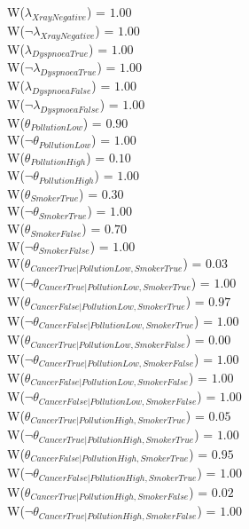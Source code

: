 \documentclass[a4paper,10pt]{report}
\begin{document}
W($\lambda_{XrayNegative}$) = $1.00$\\ 
W($\neg \lambda_{XrayNegative}$) = $1.00$\\ 
W($\lambda_{DyspnoeaTrue}$) = $1.00$\\ 
W($\neg \lambda_{DyspnoeaTrue}$) = $1.00$\\ 
W($\lambda_{DyspnoeaFalse}$) = $1.00$\\ 
W($\neg \lambda_{DyspnoeaFalse}$) = $1.00$\\ 
W($\theta_{PollutionLow}$) = $0.90$\\ 
W($\neg\theta_{PollutionLow}$) = $1.00$\\ 
W($\theta_{PollutionHigh}$) = $0.10$\\ 
W($\neg\theta_{PollutionHigh}$) = $1.00$\\ 
W($\theta_{SmokerTrue}$) = $0.30$\\ 
W($\neg\theta_{SmokerTrue}$) = $1.00$\\ 
W($\theta_{SmokerFalse}$) = $0.70$\\ 
W($\neg\theta_{SmokerFalse}$) = $1.00$\\ 
W($\theta_{CancerTrue|PollutionLow,SmokerTrue}$) = $0.03$\\ 
W($\neg\theta_{CancerTrue|PollutionLow,SmokerTrue}$) = $1.00$\\ 
W($\theta_{CancerFalse|PollutionLow,SmokerTrue}$) = $0.97$\\ 
W($\neg\theta_{CancerFalse|PollutionLow,SmokerTrue}$) = $1.00$\\ 
W($\theta_{CancerTrue|PollutionLow,SmokerFalse}$) = $0.00$\\ 
W($\neg\theta_{CancerTrue|PollutionLow,SmokerFalse}$) = $1.00$\\ 
W($\theta_{CancerFalse|PollutionLow,SmokerFalse}$) = $1.00$\\ 
W($\neg\theta_{CancerFalse|PollutionLow,SmokerFalse}$) = $1.00$\\ 
W($\theta_{CancerTrue|PollutionHigh,SmokerTrue}$) = $0.05$\\ 
W($\neg\theta_{CancerTrue|PollutionHigh,SmokerTrue}$) = $1.00$\\ 
W($\theta_{CancerFalse|PollutionHigh,SmokerTrue}$) = $0.95$\\ 
W($\neg\theta_{CancerFalse|PollutionHigh,SmokerTrue}$) = $1.00$\\ 
W($\theta_{CancerTrue|PollutionHigh,SmokerFalse}$) = $0.02$\\ 
W($\neg\theta_{CancerTrue|PollutionHigh,SmokerFalse}$) = $1.00$\\ 
\end{document}
